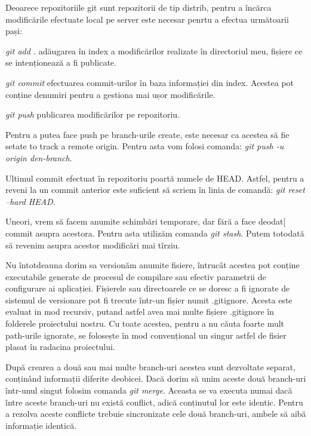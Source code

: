 	Deoarece repozitoriile git sunt repozitorii de tip distrib, pentru a încărca modificările efectuate local pe server este necesar penrtu a efectua următoarii pași:
	\begin{list}{•}
	\item  \textit{git add .} adăugarea în index a modificărilor realizate în directoriul meu, fișiere ce se intenționează a fi publicate.
	\item \textit{git commit} efectuarea commit-urilor în baza informației din index. Acestea pot conține denumiri pentru a gestiona mai ușor modificările.
	\item \textit{git push} publicarea modificărilor pe repozitoriu.
	\end{list}
	
	Pentru a putea face push pe branch-urile create, este necesar ca acestea să fie setate to track a remote origin. Pentru asta vom folosi comanda: \textit{git push -u origin den-branch}. 
	
	Ultimul commit efectuat în repozitoriu poartă numele de HEAD. Astfel, pentru a reveni la un commit anterior este suficient să scriem în linia de comandă: \textit{git reset --hard HEAD}.
	
	Uneori, vrem să facem anumite schimbări temporare, dar fără a face deodat[ commit asupra acestora. Pentru asta utilizăm comanda \textit{git stash}. Putem totodată să revenim asupra acestor modificări mai tîrziu.
	
	Nu întotdeauna dorim sa versionăm anumite fisiere, întrucât acestea pot conține executabile generate de procesul de compilare sau efectiv parametrii de configurare ai aplicației. Fișierele sau directoarele ce se doresc a fi ignorate de sistemul de versionare pot fi trecute într-un fișier numit .gitignore. Acesta este evaluat in mod recursiv, putand astfel avea mai multe fișiere .gitignore în folderele proiectului nostru. Cu toate acestea, pentru a nu căuta foarte mult path-urile ignorate, se folosește în mod convențional un singur astfel de fisier plasat în radacina proiectului.
	
	După crearea a două sau mai multe branch-uri acestea sunt dezvoltate separat, conținând informații diferite deobicei. Dacă dorim să unim aceste două branch-uri într-unul singut folosim comanda \textit{git merge}. Aceasta se va executa numai dacă între aceste branch-uri nu există conflict, adică conținutul lor este identic. Pentru a rezolva aceste conflicte trebuie sincronizate cele două branch-uri, ambele să aibă informație identică.
	
